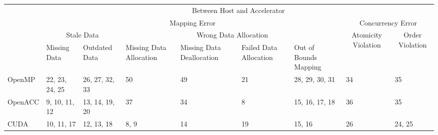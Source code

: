 \documentclass[border=10pt]{standalone}
\begin{document}
\begin{tabular}{|p{2cm}|p{1.5cm}|p{2cm}|p{2cm}|p{2cm}|p{2cm}|p{2cm}|p{2cm}|p{2cm}|p{1cm}|}
\hline
\multirow{4}{*}{} & \multicolumn{9}{c|}{Between Host and Accelerator}                                                                                                                                                                                                          \\ \cline{2-10} 
                  & \multicolumn{6}{c|}{Mapping Error}                                                                                                     & \multicolumn{3}{c|}{Concurrency Error}                                                                            \\ \cline{2-10} 
                  & \multicolumn{2}{c|}{Stale Data} & \multicolumn{4}{c|}{Wrong Data Allocation}                                                           & \multicolumn{1}{c|}{\multirow{2}{*}{Atomicity Violation}} & \multicolumn{2}{c|}{\multirow{2}{*}{Order Violation}} \\ \cline{2-7}
                  & Missing Data   & Outdated Data  & Missing Data Allocation & Missing Data Deallocation & Failed Data Allocation & Out of Bounds Mapping & \multicolumn{1}{c|}{}                                     & \multicolumn{2}{c|}{}                                 \\ \hline
OpenMP            & 22, 23, 24, 25 & 26, 27, 32, 33 & 50                      & 49                        & 21                     & 28, 29, 30, 31        & 34                                                        & \multicolumn{2}{l|}{35}                               \\ \hline
OpenACC           & 9, 10, 11, 12  & 13, 14, 19, 20 & 37                      & 34                        & 8                      & 15, 16, 17, 18        & 36                                                        & \multicolumn{2}{l|}{35}                               \\ \hline
CUDA              & 10, 11, 17     & 12, 13, 18     & 8, 9                    & 14                        & 19                     & 15, 16                & 26                                                        & \multicolumn{2}{l|}{24, 25}                           \\ \hline
\end{tabular}
\end{document}
